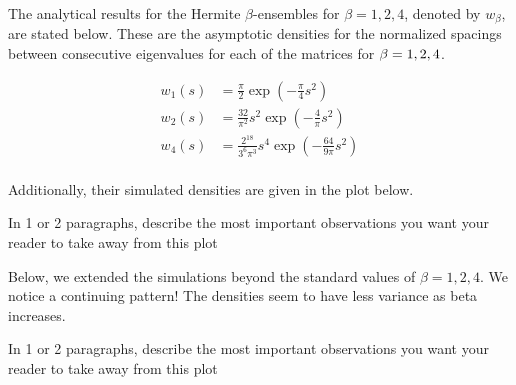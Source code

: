 
\newpage


The analytical results for the Hermite $\beta$-ensembles for $\beta = 1, 2, 4$, denoted by $w_\beta$, are stated below.
These are the asymptotic densities for the normalized spacings between consecutive eigenvalues for each of the matrices for $\beta = 1,2,4$.

\begin{align*}
  w_1(s) &= \frac{\pi}{2} \exp(-\frac{\pi}{4}s^2) \\
  w_2(s) &= \frac{32}{\pi^2} s^2 \exp(-\frac{4}{\pi}s^2) \\
  w_4(s) &= \frac{2^{18}}{3^{6}\pi^3} s^4 \exp(-\frac{64}{9\pi}s^2) \\
\end{align*}

Additionally, their simulated densities are given in the plot below.



In 1 or 2 paragraphs, describe the most important observations you want your reader to take away from this plot

\newpage


Below, we extended the simulations beyond the standard values of $\beta = 1,2,4$. We notice a continuing pattern! The densities seem to have less variance as
beta increases.



In 1 or 2 paragraphs, describe the most important observations you want your reader to take away from this plot

\newpage
